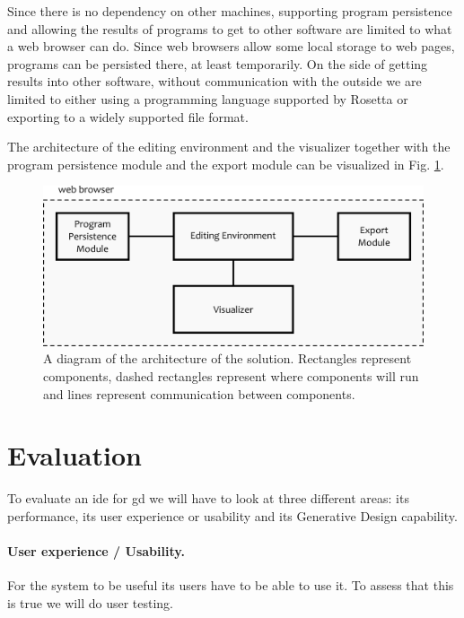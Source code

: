 \documentclass{./llncs2e/llncs}
\begin{document}
	Since there is no dependency on other machines, supporting program persistence and allowing the results of programs to get to other software are limited to what a web browser can do.
	Since web browsers allow some local storage to web pages, programs can be persisted there, at least temporarily.
	On the side of getting results into other software, without communication with the outside we are limited to either using a programming language supported by Rosetta or exporting to a widely supported file format.
	
	The architecture of the editing environment and the visualizer together with the program persistence module and the export module can be visualized in Fig. \ref{fig:gen:sol}.
	
	\begin{figure}
		\centering
		\includegraphics[width=1.0\textwidth]{img/gen_sol}
		\caption{A diagram of the architecture of the solution. Rectangles represent components, dashed rectangles represent where components will run and lines represent communication between components.}
		\label{fig:gen:sol}
	\end{figure}	

\section{Evaluation}
	To evaluate an \ac{ide} for \ac{gd} we will have to look at three different areas:
	its performance, its user experience or usability and its Generative Design capability.
	
	\paragraph{User experience / Usability.}
	For the system to be useful its users have to be able to use it.
	To assess that this is true we will do user testing.
	
\end{document}
